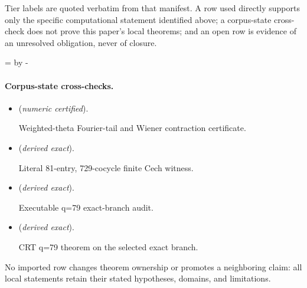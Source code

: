 \documentclass[11pt]{article}
\theoremstyle{definition}
\theoremstyle{remark}
\let\MTToriginalitem\item
\renewcommand{\item}{\par\MTToriginalitem}
\begin{document}
Tier labels are quoted verbatim from that manifest. A row used directly supports only the specific computational statement identified above; a corpus-state cross-check does not prove this paper's local theorems; and an open row is evidence of an unresolved obligation, never of closure.

\par\begingroup{}=\pagegoal\advance{} by -\pagetotal\ifdim\dimen0<7\baselineskip\newpage\fi\endgroup
\paragraph{Corpus-state cross-checks.}
\begin{itemize}
\setlength{\itemsep}{0.25em}
\item {} (\emph{numeric certified}).\par Weighted-theta Fourier-tail and Wiener contraction certificate.
\item {} (\emph{derived exact}).\par Literal 81-entry, 729-cocycle finite Cech witness.
\item {} (\emph{derived exact}).\par Executable q=79 exact-branch audit.
\item {} (\emph{derived exact}).\par CRT q=79 theorem on the selected exact branch.
\end{itemize}

No imported row changes theorem ownership or promotes a neighboring claim: all local statements retain their stated hypotheses, domains, and limitations.


\end{document}
